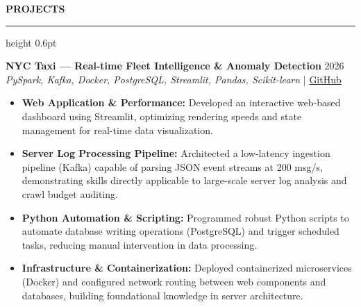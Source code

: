 ﻿\documentclass{resume}
\renewcommand{\sectionskip}{\vspace{5pt}}
\renewcommand{\sectionlineskip}{\vspace{3pt}}
\renewenvironment{rSection}[1]{
  \sectionskip
  {\color{headerblue}\textbf{\MakeUppercase{#1}}}
  \sectionlineskip
  {\color{rulegray}\hrule height 0.6pt}
  \vspace{0pt}
  \begin{list}{}{
    \setlength{\leftmargin}{0em}
    \setlength{\topsep}{0pt}
    \setlength{\partopsep}{0pt}
    \setlength{\parsep}{0pt}
    \setlength{\itemsep}{0pt}
  }
  \item[]
}{
  \end{list}
}
\begin{document}
\begin{rSection}{Projects}
    \item \textbf{NYC Taxi — Real-time Fleet Intelligence \& Anomaly Detection} \hfill 2026\\
    {\small \textit{PySpark, Kafka, Docker, PostgreSQL, Streamlit, Pandas, Scikit-learn}} \hfill | \href{https://github.com/vietpham10205/real-time-Fleet-Intelligence-anomaly-detection-dashboard}{GitHub}
    {\small
    \begin{itemize}[itemsep=4pt, parsep=0pt, leftmargin=1.2em]
        \item \textbf{Web Application \& Performance:} Developed an interactive web-based dashboard using Streamlit, optimizing rendering speeds and state management for real-time data visualization.
        \item \textbf{Server Log Processing Pipeline:} Architected a low-latency ingestion pipeline (Kafka) capable of parsing JSON event streams at 200 msg/s, demonstrating skills directly applicable to large-scale server log analysis and crawl budget auditing.
        \item \textbf{Python Automation \& Scripting:} Programmed robust Python scripts to automate database writing operations (PostgreSQL) and trigger scheduled tasks, reducing manual intervention in data processing.
        \item \textbf{Infrastructure \& Containerization:} Deployed containerized microservices (Docker) and configured network routing between web components and databases, building foundational knowledge in server architecture.
    \end{itemize}
    }
    \vspace{15pt}


\end{rSection}
\end{document}
